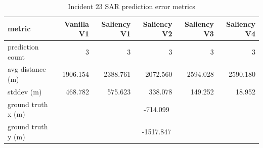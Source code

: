 \begin{table}[ht]
\centering
\caption{Incident 23 SAR prediction error metrics}
\label{tab:sar-incident-23}
\begin{tabular}{lrrrrr}
\hline
metric & Vanilla V1 & Saliency V1 & Saliency V2 & Saliency V3 & Saliency V4 \\
\hline
prediction count & 3 & 3 & 3 & 3 & 3 \\
avg distance (m) & 1906.154 & 2388.761 & 2072.560 & 2594.028 & 2590.180 \\
stddev (m) & 468.782 & 575.623 & 338.078 & 149.252 & 18.952 \\
ground truth x (m) & \multicolumn{5}{c}{-714.099} \\
ground truth y (m) & \multicolumn{5}{c}{-1517.847} \\
\hline
\end{tabular}
\end{table}
